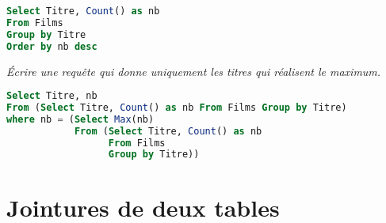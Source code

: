 \begin{Answer}
\begin{lstlisting}[language=SQL]
Select Titre, Count() as nb
From Films
Group by Titre
Order by nb desc
\end{lstlisting}
\newpage
\end{Answer}
\begin{Exercise} \it Écrire une requête qui donne uniquement les titres qui réalisent le maximum.
\end{Exercise}
\begin{Answer}
\begin{lstlisting}[language=SQL]
Select Titre, nb
From (Select Titre, Count() as nb From Films Group by Titre)
where nb = (Select Max(nb) 
            From (Select Titre, Count() as nb 
                  From Films 
                  Group by Titre))
\end{lstlisting}
\end{Answer}
\section{Jointures de deux tables}
